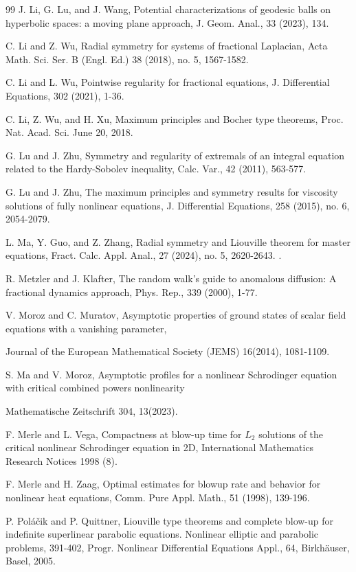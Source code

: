 \documentclass[12pt]{article}
\theoremstyle{remark}
\numberwithin{equation}{section}
\begin{document}
\begin{thebibliography}{99}
  J. Li, G. Lu, and J. Wang, Potential characterizations of geodesic balls on hyperbolic spaces: a moving plane
approach, J. Geom. Anal., 33 (2023), 134.

  C. Li and Z. Wu, Radial symmetry for systems of fractional Laplacian, Acta Math. Sci. Ser. B (Engl. Ed.) 38 (2018), no. 5, 1567-1582.

    C. Li and L. Wu, Pointwise regularity for fractional equations, J. Differential Equations, 302 (2021), 1-36.

  C. Li, Z. Wu, and H. Xu, Maximum principles and Bocher type theorems, Proc. Nat. Acad. Sci. June 20, 2018.

  G. Lu and  J. Zhu, Symmetry and regularity of extremals of an integral equation related to the Hardy-Sobolev inequality, Calc. Var., 42 (2011), 563-577.

   G. Lu and J. Zhu, The maximum principles and symmetry results for viscosity solutions of fully nonlinear equations, J. Differential Equations, 258 (2015), no. 6, 2054-2079.


 L. Ma, Y. Guo, and Z. Zhang, Radial symmetry and Liouville theorem for master equations, Fract. Calc. Appl. Anal., 27 (2024), no. 5, 2620-2643. .

 R. Metzler and J. Klafter, The random walk's guide to anomalous diffusion: A fractional dynamics approach, Phys. Rep., 339 (2000), 1-77.

 V. Moroz and C. Muratov, Asymptotic properties of ground states of scalar field equations with a vanishing parameter,

Journal of the European Mathematical Society (JEMS) 16(2014), 1081-1109.

 S. Ma and V. Moroz,  Asymptotic profiles for a nonlinear Schrodinger equation with critical combined powers nonlinearity

Mathematische Zeitschrift 304, 13(2023).

 F. Merle and L. Vega, Compactness at blow-up time for $L_2$ solutions of the critical nonlinear Schrodinger equation in 2D, International Mathematics Research Notices 1998 (8).

 F. Merle and H. Zaag, Optimal estimates for blowup rate and behavior for nonlinear heat equations, Comm. Pure Appl. Math., 51 (1998), 139-196.



P. Pol\'{a}\v{c}ik and P. Quittner, Liouville type theorems and complete blow-up for indefinite superlinear parabolic equations. Nonlinear elliptic and parabolic problems, 391-402, Progr. Nonlinear Differential Equations Appl., 64, Birkh\"{a}user, Basel, 2005.


\end{thebibliography}
\end{document}
